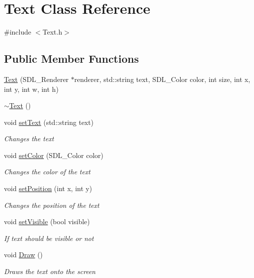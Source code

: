 \hypertarget{class_text}{}\section{Text Class Reference}
\label{class_text}


{\ttfamily \#include $<$Text.\+h$>$}

\subsection*{Public Member Functions}
\begin{DoxyCompactItemize}
\item 
\mbox{\hyperlink{class_text_a1a244ff955d98640e0046acef0659413}{Text}} (S\+D\+L\+\_\+\+Renderer $\ast$renderer, std\+::string text, S\+D\+L\+\_\+\+Color color, int size, int x, int y, int w, int h)
\item 
\mbox{\hyperlink{class_text_a2d49e5c280e205125b149f7777ae30c7}{$\sim$\+Text}} ()
\item 
void \mbox{\hyperlink{class_text_ab2d8c95b3d746ae3e8c0fba8318743c9}{set\+Text}} (std\+::string text)
\begin{DoxyCompactList}\small\item\em Changes the text \end{DoxyCompactList}\item 
void \mbox{\hyperlink{class_text_abb8e725b17de08304a97119d39df5cc1}{set\+Color}} (S\+D\+L\+\_\+\+Color color)
\begin{DoxyCompactList}\small\item\em Changes the color of the text \end{DoxyCompactList}\item 
void \mbox{\hyperlink{class_text_a55995c22d9a3166ccd856f3b632f2354}{set\+Position}} (int x, int y)
\begin{DoxyCompactList}\small\item\em Changes the position of the text \end{DoxyCompactList}\item 
void \mbox{\hyperlink{class_text_a654ac74524e48652f9aa789d2612052b}{set\+Visible}} (bool visible)
\begin{DoxyCompactList}\small\item\em If text should be visible or not \end{DoxyCompactList}\item 
void \mbox{\hyperlink{class_text_af4bb084ff0f66ad827ef6b006f9b0ebd}{Draw}} ()
\begin{DoxyCompactList}\small\item\em Draws the text onto the screen \end{DoxyCompactList}\end{DoxyCompactItemize}
